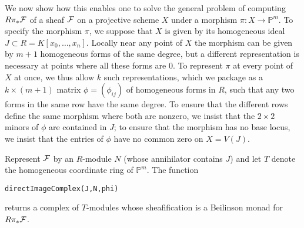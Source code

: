 \documentclass[twoside,12pt, leqno]{amsart}
\def\PP{{\mathbb P}}
\begin{document}
We now show how this enables one to solve the general problem of computing $R\pi_* {\mathcal F}$ of a sheaf ${\mathcal F}$ on a projective scheme $X$ under a morphism 
$
\pi \colon X \to \PP^m.
$
%
To specify the morphism $\pi$, we suppose that $X$ is given by its homogeneous ideal $J \subset R = K[x_0,\ldots,x_n]$. Locally near any point of $X$ the morphism can be given by $m+1$ homogeneous
forms of the same degree, but a different representation is necessary at points where all these forms are 0. To represent $\pi$
at every point of $X$ at once, we thus allow $k$ such representations, which we package as a
 $k \times (m+1)$ matrix $\phi=(\phi_{ij})$ of homogeneous forms in $R$, such that any two forms
 in the same row have the same degree. To ensure that the different rows define the same
 morphism where both are nonzero, we insist that the $2\times 2$ minors of $\phi$ are contained in $J$;
 to ensure that the morphism has no base locus, 
 we insist that the entries of $\phi$ have no common zero on $X=V(J)$.

Represent ${\mathcal F}$ by an $R$-module $N$
(whose annihilator contains $J$) and let $T$ denote the homogeneous coordinate ring of $\PP^m$.  The function
{\small \begin{verbatim}
directImageComplex(J,N,phi)
\end{verbatim} }
\noindent returns a complex of $T$-modules whose sheafification
is a Beilinson monad for $R\pi_* {\mathcal F}$. 
\end{document}
